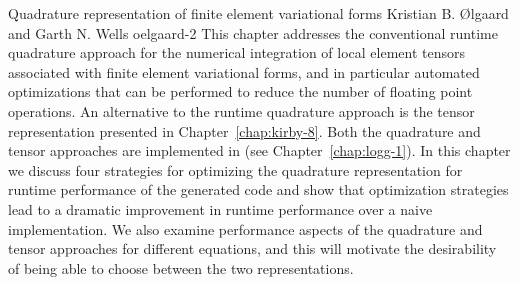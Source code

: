               {Quadrature representation of finite element variational forms}
              {Kristian B. \O{}lgaard and Garth N. Wells}
              {oelgaard-2}
This chapter addresses the conventional runtime quadrature approach
for the numerical integration of local element tensors associated
with finite element variational forms, and in particular automated
optimizations that can be performed to reduce the number of floating
point operations.  An alternative to the runtime quadrature approach
is the tensor representation presented in Chapter~\ref{chap:kirby-8}.
Both the quadrature and tensor approaches are implemented in \ffc{}
(see Chapter~\ref{chap:logg-1}).  In this chapter we discuss four
strategies for optimizing the quadrature representation for runtime
performance of the generated code and show that optimization strategies
lead to a dramatic improvement in runtime performance over a naive
implementation.  We also examine performance aspects of the quadrature
and tensor approaches for different equations, and this will motivate
the desirability of being able to choose between the two representations.
